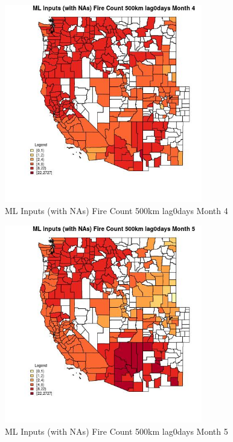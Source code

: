 \begin{figure} 
\centering  
\includegraphics[width=0.77\textwidth]{Code_Outputs/Report_ML_input_PM25_Step4_part_f_de_duplicated_aveswNAs_CountyFire_Count_500km_lag0daysmedianMonth4.jpg} 
\caption{\label{fig:Report_ML_input_PM25_Step4_part_f_de_duplicated_aveswNAsCountyFire_Count_500km_lag0daysmedianMonth4}ML Inputs (with NAs) Fire Count 500km lag0days Month 4} 
\end{figure} 
 

\clearpage 

\begin{figure} 
\centering  
\includegraphics[width=0.77\textwidth]{Code_Outputs/Report_ML_input_PM25_Step4_part_f_de_duplicated_aveswNAs_CountyFire_Count_500km_lag0daysmedianMonth5.jpg} 
\caption{\label{fig:Report_ML_input_PM25_Step4_part_f_de_duplicated_aveswNAsCountyFire_Count_500km_lag0daysmedianMonth5}ML Inputs (with NAs) Fire Count 500km lag0days Month 5} 
\end{figure} 
 

